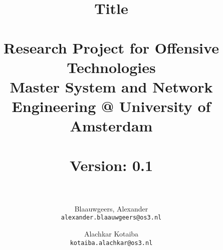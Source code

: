 \documentclass[a4paper, 12pt, one column]{article}
\title{ Title \\~\\
\large Research Project for Offensive Technologies
\\Master System and Network Engineering @ University of Amsterdam\\~\\
\textbf{Version:} 0.1\\~\\}
\author{Blaauwgeers, Alexander \\ \texttt{alexander.blaauwgeers@os3.nl} \and Alachkar Kotaiba  \\ \texttt{kotaiba.alachkar@os3.nl}}
\begin{document}
\maketitle
\clearpage






\\~\\






\\~\\





\nocite{*}
\printbibliography
\end{document}
